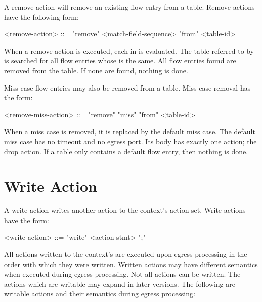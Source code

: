 A remove action will remove an existing flow entry from a table. Remove actions have the following form:

\begin{minip}
\begin{grammar}
<remove-action> ::= "remove" <match-field-sequence> "from" <table-id>
\end{grammar}
\end{minip}

When a remove action is executed, each  in  is evaluated. The table referred to by  is searched for all flow entries whose  is the same. All flow entries found are removed from the table. If none are found, nothing is done.

Miss case flow entries may also be removed from a table. Miss case removal has the form: 

\begin{minip}
\begin{grammar}
<remove-miss-action> ::= "remove" "miss" "from" <table-id>
\end{grammar}
\end{minip}

When a miss case is removed, it is replaced by the default miss case. The default miss case has no timeout and no egress port. Its body has exactly one action; the drop action. If a table only contains a default flow entry, then nothing is done.

\section{Write Action} \label{guide:write}

A write action writes another action to the context's action set. Write actions have the form:

\begin{minip}
\begin{grammar}
<write-action> ::= "write" <action-stmt> ";"
\end{grammar}
\end{minip}

All actions written to the context's are executed upon egress processing in the order with which they were written. Written actions may have different semantics when executed during egress processing. Not all actions can be written. The actions which are writable may expand in later versions. The following are writable actions and their semantics during egress processing:

